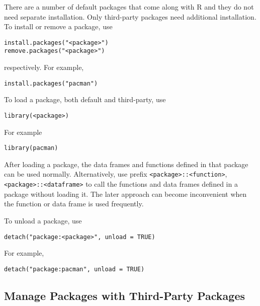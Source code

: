 There are a number of default packages that come along with R and they do not need separate installation. Only third-party packages need additional installation. To install or remove a package, use
\begin{lstlisting}
install.packages("<package>")
remove.packages("<package>")
\end{lstlisting}
respectively. For example,
\begin{lstlisting}
install.packages("pacman")
\end{lstlisting}

To load a package, both default and third-party, use
\begin{lstlisting}
library(<package>)
\end{lstlisting}
For example
\begin{lstlisting}
library(pacman)
\end{lstlisting}
After loading a package, the data frames and functions defined in that package can be used normally. Alternatively, use prefix \verb|<package>::<function>|, \verb|<package>::<dataframe>| to call the functions and data frames defined in a package without loading it. The later approach can become inconvenient when the function or data frame is used frequently. 

To unload a package, use
\begin{lstlisting}
detach("package:<package>", unload = TRUE)
\end{lstlisting}
For example,
\begin{lstlisting}
detach("package:pacman", unload = TRUE)
\end{lstlisting}

\subsection{Manage Packages with Third-Party Packages}

